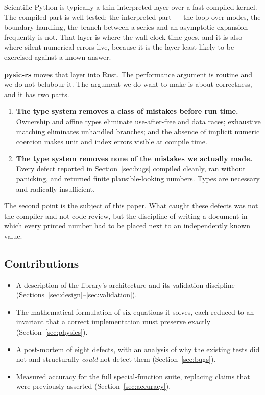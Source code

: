 \documentclass[11pt,a4paper]{article}
\theoremstyle{plain}
\theoremstyle{definition}
\begin{document}
Scientific Python is typically a thin interpreted layer over a fast compiled
kernel. The compiled part is well tested; the interpreted part --- the loop over
modes, the boundary handling, the branch between a series and an asymptotic
expansion --- frequently is not. That layer is where the wall-clock time goes,
and it is also where silent numerical errors live, because it is the layer least
likely to be exercised against a known answer.

\textbf{pysic-rs} moves that layer into Rust. The performance argument is
routine and we do not belabour it. The argument we do want to make is about
correctness, and it has two parts.

\begin{enumerate}
\item \textbf{The type system removes a class of mistakes before run time.}
      Ownership and affine types eliminate use-after-free and data races;
      exhaustive matching eliminates unhandled branches; and the absence of
      implicit numeric coercion makes unit and index errors visible at compile
      time.
\item \textbf{The type system removes none of the mistakes we actually made.}
      Every defect reported in Section~\ref{sec:bugs} compiled cleanly, ran
      without panicking, and returned finite plausible-looking numbers. Types
      are necessary and radically insufficient.
\end{enumerate}

The second point is the subject of this paper. What caught these defects was not
the compiler and not code review, but the discipline of writing a document in
which every printed number had to be placed next to an independently known
value.

\subsection{Contributions}

\begin{itemize}
\item A description of the library's architecture and its validation
      discipline (Sections~\ref{sec:design}--\ref{sec:validation}).
\item The mathematical formulation of six equations it solves, each reduced to
      an invariant that a correct implementation must preserve exactly
      (Section~\ref{sec:physics}).
\item A post-mortem of eight defects, with an analysis of why the existing tests
      did not and structurally \emph{could} not detect them
      (Section~\ref{sec:bugs}).
\item Measured accuracy for the full special-function suite, replacing claims
      that were previously asserted (Section~\ref{sec:accuracy}).
\end{itemize}
\end{document}
